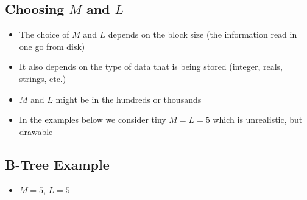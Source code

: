 
\begin{slide}
\section{Choosing $M$ and $L$}

\begin{PauseHighLight}
  \begin{itemize}
  \item The choice of $M$ and $L$ depends on the block size (the
    information read in one go from disk)\pause
  \item It also depends on the type of data that is being stored
    (integer, reals, strings, etc.)\pause
  \item $M$ and $L$ might be in the hundreds or thousands\pause
  \item In the examples below we consider tiny $M = L = 5$ which is
    unrealistic, but drawable\pause
  \end{itemize}
\end{PauseHighLight}

\end{slide}



\begin{slide}
\section{B-Tree Example}
\begin{itemize}
\item $M=5$, $L=5$
\end{itemize}
\pb\pause
\begin{center}
 \pause
\end{center}
\end{slide}


